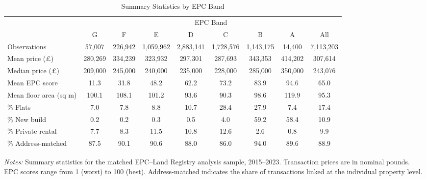 \begin{table}[htbp]
\centering
\caption{Summary Statistics by EPC Band}
\label{tab:summary}
\begin{adjustbox}{max width=\textwidth}
\begin{tabular}{lcccccccc}
\toprule
 & \multicolumn{8}{c}{EPC Band} \\
\cmidrule(lr){2-9}
 & {G} & {F} & {E} & {D} & {C} & {B} & {A} & {All} \\
\midrule
Observations & 57,007 & 226,942 & 1,059,962 & 2,883,141 & 1,728,576 & 1,143,175 & 14,400 & 7,113,203 \\
Mean price (\pounds) & 280,269 & 334,239 & 323,932 & 297,301 & 287,693 & 343,353 & 414,202 & 307,614 \\
Median price (\pounds) & 209,000 & 245,000 & 240,000 & 235,000 & 228,000 & 285,000 & 350,000 & 243,076 \\
Mean EPC score & 11.3 & 31.8 & 48.2 & 62.2 & 73.2 & 83.9 & 94.6 & 65.0 \\
Mean floor area (sq m) & 100.1 & 108.1 & 101.2 & 93.6 & 90.3 & 98.6 & 119.9 & 95.3 \\
\% Flats & 7.0 & 7.8 & 8.8 & 10.7 & 28.4 & 27.9 & 7.4 & 17.4 \\
\% New build & 0.2 & 0.2 & 0.3 & 0.5 & 4.0 & 59.2 & 58.4 & 10.9 \\
\% Private rental & 7.7 & 8.3 & 11.5 & 10.8 & 12.6 & 2.6 & 0.8 & 9.9 \\
\% Address-matched & 87.5 & 90.1 & 90.6 & 88.0 & 86.0 & 94.0 & 89.6 & 88.9 \\
\bottomrule
\end{tabular}
\end{adjustbox}
\begin{minipage}{\textwidth}
\footnotesize
\textit{Notes:} Summary statistics for the matched EPC--Land Registry analysis sample, 2015--2023.
Transaction prices are in nominal pounds. EPC scores range from 1 (worst) to 100 (best).
Address-matched indicates the share of transactions linked at the individual property level.
\end{minipage}
\end{table}

